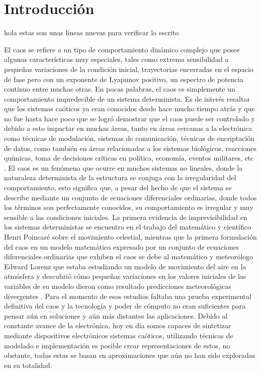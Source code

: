 \chapter{Introducción}
	hola estas son unas lineas nuevas para verificar lo escrito 
	
	El caos se refiere a un tipo de comportamiento dinámico complejo que posee algunas características muy especiales, tales como extrema sensibilidad a pequeñas variaciones de la condición inicial, trayectorias encerradas en el espacio de fase pero con un exponente de Lyapunov positivo, un espectro de potencia continuo entre muchas otras. En pocas palabras, el caos es simplemente un comportamiento impredecible de un sistema determinista. Es de interés resaltar que los sistemas caóticos ya eran conocidos desde hace mucho tiempo atrás y que no fue hasta hace poco que se logró demostrar que el caos puede ser controlado y debido a esto impactar en muchas áreas, tanto en áreas cercanas a la electrónica como técnicas de modulación, sistemas de comunicación, técnicas de encriptación de datos, como también en áreas  relacionadas a los sistemas biológicos, reacciones químicas, toma de decisiones críticas en política, economía, eventos militares, etc  \cite{Munoz-Pacheco2010}. El caos es un fenómeno que ocurre en muchos sistemas no lineales, donde la naturaleza determinista de la estructura se conjuga con la irregularidad del comportamiento, esto significa que, a pesar del hecho de que el sistema se describe mediante un conjunto de ecuaciones diferenciales ordinarias, donde todos los términos son perfectamente conocidos, su comportamiento es irregular y muy sensible a las condiciones iniciales. La primera evidencia de imprevisibilidad en los sistemas deterministas se encuentra en el trabajo del matemático y científico Henri Poincaré sobre el movimiento celestial, mientras que la primera formulación del caos en un modelo matemático expresado por un conjunto de ecuaciones diferenciales ordinarias que exhiben el caos se debe al matemático y meteorólogo Edward Lorenz que estaba estudiando un modelo de movimiento del aire en la atmósfera y descubrió cómo pequeñas variaciones en los valores iniciales de las variables de su modelo dieron como resultado predicciones meteorológicas divergentes \cite{Buscarino2014}. Para el momento de esos estudios faltaba una prueba experimental definitiva del caos y la tecnología y poder de cómputo no eran suficientes para pensar aún en soluciones y aún más distantes las aplicaciones. Debido al constante avance de la electrónica, hoy en día somos capaces de sintetizar mediante dispositivos electrónicos sistemas caóticos, utilizando técnicas de modelado e implementación es posible crear representaciones de estos, no obstante, todas estas se basan en aproximaciones que aún no han sido exploradas en su totalidad. 
